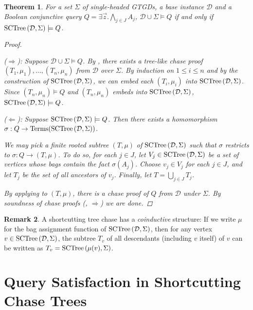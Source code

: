 \documentclass[12pt]{report}
\theoremstyle{plain}
\newtheorem{theorem}{Theorem}[chapter]
\theoremstyle{definition}
\newtheorem{remark}[theorem]{Remark}
\def\Terms{{\mathrm{Terms}}}
\newcommand{\SCTree}[2]{\ensuremath{\normalfont{\textrm{SCTree}} \left( #1, #2 \right)}}
\begin{document}
\begin{theorem}
\label{sctree-soundness-completeness}
  For a set $\Sigma$ of single-headed GTGDs, a base instance $\mathcal{D}$ and a Boolean conjunctive query $Q = \exists \vec{z}. \bigwedge_{j \in J} A_j$, $\mathcal{D} \cup \Sigma \models Q$ if and only if $\SCTree{\mathcal{D}}{\Sigma} \models Q$.
  \begin{proof}[Proof] $ $\par
    ($\Longrightarrow$): Suppose $\mathcal{D} \cup \Sigma \models Q$. By , there exists a tree-like chase proof $(T_1, \mu_1), \ldots, (T_n, \mu_n)$ from $\mathcal{D}$ over $\Sigma$. By induction on $1 \leq i \leq n$ and by the construction of $\SCTree{\mathcal{D}}{\Sigma}$, we can embed each $(T_i, \mu_i)$ into $\SCTree{\mathcal{D}}{\Sigma}$. Since $(T_n, \mu_n) \models Q$ and $(T_n, \mu_n)$ embeds into $\SCTree{\mathcal{D}}{\Sigma}$, $\SCTree{\mathcal{D}}{\Sigma} \models Q$.

    ($\Longleftarrow$): Suppose $\SCTree{\mathcal{D}}{\Sigma} \models Q$. Then there exists a homomorphism $\sigma:\nobreak Q \rightarrow \Terms(\SCTree{\mathcal{D}}{\Sigma})$.
    
    We may pick a finite rooted subtree $(T, \mu)$ of $\SCTree{\mathcal{D}}{\Sigma}$ such that $\sigma$ restricts to $\sigma: Q \rightarrow (T, \mu)$. To do so, for each $j \in J$, let $V_j \in \SCTree{\mathcal{D}}{\Sigma}$ be a set of vertices whose bags contain the fact $\sigma(A_j)$. Choose $v_j \in V_j$ for each $j \in J$, and let $T_j$ be the set of all ancestors of $v_j$. Finally, let $T = \bigcup_{j \in J} T_j$.

    By applying  to $(T, \mu)$, there is a chase proof of $Q$ from $\mathcal{D}$ under $\Sigma$. By soundness of chase proofs (, $\Longrightarrow$) we are done.
  \end{proof}
\end{theorem}

\begin{remark}
\label{coinductiveness-of-sctree}
  A shortcutting tree chase has a \emph{coinductive} structure: If we write $\mu$ for the bag assignment function of $\SCTree{\mathcal{D}}{\Sigma}$, then for any vertex $v \in \SCTree{\mathcal{D}}{\Sigma}$, the subtree $T_v$ of all descendants (including $v$ itself) of $v$ can be written as $T_v = \SCTree{\mu(v)}{\Sigma}$.
\end{remark}

\section{Query Satisfaction in Shortcutting Chase Trees}
\end{document}
